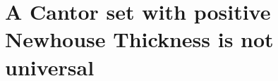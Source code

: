 \documentclass[12pt,oneside]{sfsuthesis}
\begin{document}
\thesistitle

\section{A Cantor set with positive Newhouse Thickness is not universal}



\printbibliography
\end{document}
